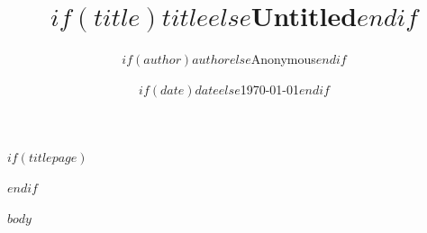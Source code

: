 \documentclass[11pt,a4paper,oneside]{book}
\title{$if(title)$$title$$else$Untitled$endif$}
\author{$if(author)$$author$$else$Anonymous$endif$}
\date{$if(date)$$date$$else$\today$endif$}
\begin{document}
$if(titlepage)$
\maketitle
\tableofcontents
\newpage
$endif$

$body$

\ifdefined\realclearpage
\realclearpage
\fi
\end{document}
